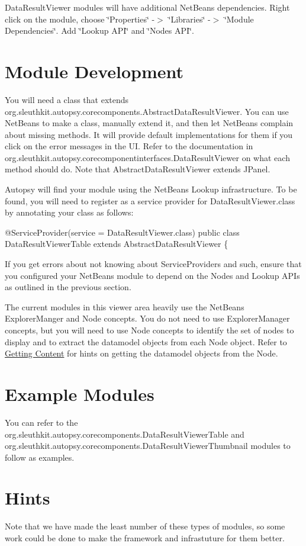 Data\+Result\+Viewer modules will have additional Net\+Beans dependencies. Right click on the module, choose \char`\"{}\+Properties\char`\"{} -\/$>$ \char`\"{}\+Libraries\char`\"{} -\/$>$ \char`\"{}\+Module Dependencies\char`\"{}. Add \char`\"{}\+Lookup A\+P\+I\char`\"{} and \char`\"{}\+Nodes A\+P\+I\char`\"{}.\hypertarget{mod_result_page_result_mod}{}\section{Module Development}\label{mod_result_page_result_mod}
You will need a class that extends org.\+sleuthkit.\+autopsy.\+corecomponents.\+Abstract\+Data\+Result\+Viewer. You can use Net\+Beans to make a class, manually extend it, and then let Net\+Beans complain about missing methods. It will provide default implementations for them if you click on the error messages in the UI. Refer to the documentation in org.\+sleuthkit.\+autopsy.\+corecomponentinterfaces.\+Data\+Result\+Viewer on what each method should do. Note that Abstract\+Data\+Result\+Viewer extends J\+Panel.

Autopsy will find your module using the Net\+Beans Lookup infrastructure. To be found, you will need to register as a service provider for Data\+Result\+Viewer.\+class by annotating your class as follows\+:


\begin{DoxyCode}
@ServiceProvider(service = DataResultViewer.class)
public class DataResultViewerTable extends AbstractDataResultViewer \{
\end{DoxyCode}


If you get errors about not knowing about Service\+Providers and such, ensure that you configured your Net\+Beans module to depend on the Nodes and Lookup A\+P\+Is as outlined in the previous section.

The current modules in this viewer area heavily use the Net\+Beans Explorer\+Manger and Node concepts. You do not need to use Explorer\+Manager concepts, but you will need to use Node concepts to identify the set of nodes to display and to extract the datamodel objects from each Node object. Refer to \hyperlink{mod_content_page_content_hints_objects}{Getting Content} for hints on getting the datamodel objects from the Node.\hypertarget{mod_result_page_result_examples}{}\section{Example Modules}\label{mod_result_page_result_examples}
You can refer to the org.\+sleuthkit.\+autopsy.\+corecomponents.\+Data\+Result\+Viewer\+Table and org.\+sleuthkit.\+autopsy.\+corecomponents.\+Data\+Result\+Viewer\+Thumbnail modules to follow as examples.\hypertarget{mod_result_page_result_hint}{}\section{Hints}\label{mod_result_page_result_hint}
Note that we have made the least number of these types of modules, so some work could be done to make the framework and infrastuture for them better.

